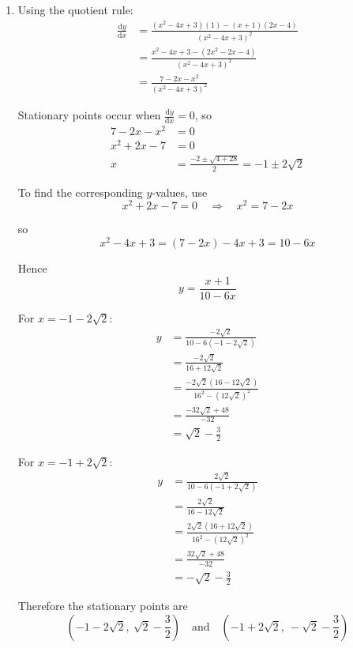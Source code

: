 \documentclass[leqno]{article}
\begin{document}
\begin{enumerate}[
  label=\textbf{\arabic*.},
  leftmargin=*,
  topsep=0pt,
  partopsep=0pt,
  parsep=0pt
]
\begin{djsSolution}
\begin{enumerate}[label=\textbf{(\alph*)}]
  Since the degree of the denominator is greater than the degree of the numerator, \(y \to 0\) as \(x\to\pm\infty\). Hence the horizontal asymptote is
  \[
  y=0
  \]

  So the asymptotes are \(x=1\), \(x=3\) and \(y=0\).

  \item
  Using the quotient rule:
  \begin{align*}
  \frac{\mathrm{d}y}{\mathrm{d}x}
  &=\frac{(x^2-4x+3)(1)-(x+1)(2x-4)}{(x^2-4x+3)^2}\\
  &=\frac{x^2-4x+3-(2x^2-2x-4)}{(x^2-4x+3)^2}\\
  &=\frac{7-2x-x^2}{(x^2-4x+3)^2}
  \end{align*}

  Stationary points occur when \(\frac{\mathrm{d}y}{\mathrm{d}x}=0\), so
  \begin{align*}
  7-2x-x^2&=0\\
  x^2+2x-7&=0\\
  x&=\frac{-2\pm\sqrt{4+28}}{2}=-1\pm2\sqrt2
  \end{align*}

  To find the corresponding \(y\)-values, use
  \[
  x^2+2x-7=0\quad\Longrightarrow\quad x^2=7-2x
  \]

  so
  \[
  x^2-4x+3=(7-2x)-4x+3=10-6x
  \]

  Hence
  \[
  y=\frac{x+1}{10-6x}
  \]

  For \(x=-1-2\sqrt2\):
  \begin{align*}
  y&=\frac{-2\sqrt2}{10-6(-1-2\sqrt2)}\\
  &=\frac{-2\sqrt2}{16+12\sqrt2}\\
  &=\frac{-2\sqrt2(16-12\sqrt2)}{16^2-(12\sqrt2)^2}\\
  &=\frac{-32\sqrt2+48}{-32}\\
  &=\sqrt2-\frac32
  \end{align*}

  For \(x=-1+2\sqrt2\):
  \begin{align*}
  y&=\frac{2\sqrt2}{10-6(-1+2\sqrt2)}\\
  &=\frac{2\sqrt2}{16-12\sqrt2}\\
  &=\frac{2\sqrt2(16+12\sqrt2)}{16^2-(12\sqrt2)^2}\\
  &=\frac{32\sqrt2+48}{-32}\\
  &=-\sqrt2-\frac32
  \end{align*}

  Therefore the stationary points are
  \[
  \left(-1-2\sqrt2,\ \sqrt2-\frac32\right)
  \quad \text{and} \quad
  \left(-1+2\sqrt2,\ -\sqrt2-\frac32\right)
  \]


\end{enumerate}
\end{djsSolution}
\end{enumerate}
\end{document}
